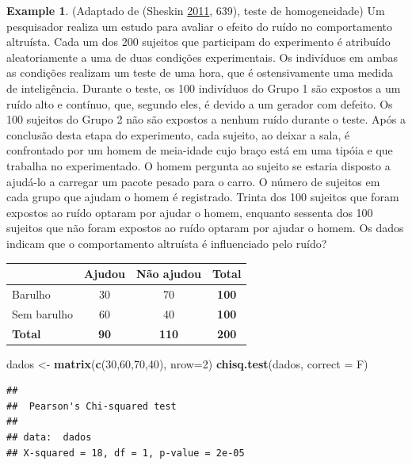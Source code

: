 \documentclass[
]{book}
\newenvironment{Shaded}{\begin{snugshade}}{\end{snugshade}}
\newcommand{\DataTypeTok}[1]{\textcolor[rgb]{0.13,0.29,0.53}{#1}}
\newcommand{\DecValTok}[1]{\textcolor[rgb]{0.00,0.00,0.81}{#1}}
\newcommand{\KeywordTok}[1]{\textcolor[rgb]{0.13,0.29,0.53}{\textbf{#1}}}
\newcommand{\NormalTok}[1]{#1}
\newcommand{\StringTok}[1]{\textcolor[rgb]{0.31,0.60,0.02}{#1}}
\theoremstyle{definition}
\theoremstyle{definition}
\newtheorem{example}{Example}[chapter]
\theoremstyle{definition}
\theoremstyle{remark}
\begin{document}
\begin{example}
\protect\hypertarget{exm:altruismo}{}{\label{exm:altruismo} }(Adaptado de (Sheskin \protect\hyperlink{ref-sheskin2011handbook}{2011}, 639), teste de homogeneidade) Um pesquisador realiza um estudo para avaliar o efeito do ruído no comportamento altruísta. Cada um dos 200 sujeitos que participam do experimento é atribuído aleatoriamente a uma de duas condições experimentais. Os indivíduos em ambas as condições realizam um teste de uma hora, que é ostensivamente uma medida de inteligência. Durante o teste, os 100 indivíduos do Grupo 1 são expostos a um ruído alto e contínuo, que, segundo eles, é devido a um gerador com defeito. Os 100 sujeitos do Grupo 2 não são expostos a nenhum ruído durante o teste. Após a conclusão desta etapa do experimento, cada sujeito, ao deixar a sala, é confrontado por um homem de meia-idade cujo braço está em uma tipóia e que trabalha no experimentado. O homem pergunta ao sujeito se estaria disposto a ajudá-lo a carregar um pacote pesado para o carro. O número de sujeitos em cada grupo que ajudam o homem é registrado. Trinta dos 100 sujeitos que foram expostos ao ruído optaram por ajudar o homem, enquanto sessenta dos 100 sujeitos que não foram expostos ao ruído optaram por ajudar o homem. Os dados indicam que o comportamento altruísta é influenciado pelo ruído?

\begin{longtable}[]{@{}lccc@{}}
\toprule
& Ajudou & Não ajudou & Total\tabularnewline
\midrule
\endhead
Barulho & 30 & 70 & \textbf{100}\tabularnewline
Sem barulho & 60 & 40 & \textbf{100}\tabularnewline
\textbf{Total} & \textbf{90} & \textbf{110} & \textbf{200}\tabularnewline
\bottomrule
\end{longtable}
\end{example}

\begin{Shaded}
\begin{Highlighting}[]
\NormalTok{dados \textless{}{-}}\StringTok{ }\KeywordTok{matrix}\NormalTok{(}\KeywordTok{c}\NormalTok{(}\DecValTok{30}\NormalTok{,}\DecValTok{60}\NormalTok{,}\DecValTok{70}\NormalTok{,}\DecValTok{40}\NormalTok{), }\DataTypeTok{nrow=}\DecValTok{2}\NormalTok{)}
\KeywordTok{chisq.test}\NormalTok{(dados, }\DataTypeTok{correct =}\NormalTok{ F)}
\end{Highlighting}
\end{Shaded}

\begin{verbatim}
## 
##  Pearson's Chi-squared test
## 
## data:  dados
## X-squared = 18, df = 1, p-value = 2e-05
\end{verbatim}
\end{document}

